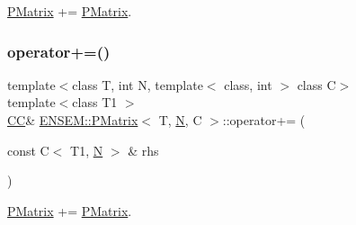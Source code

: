 \mbox{\hyperlink{classENSEM_1_1PMatrix}{P\+Matrix}} += \mbox{\hyperlink{classENSEM_1_1PMatrix}{P\+Matrix}}. 

\mbox{\label{classENSEM_1_1PMatrix_af6bd651888f2621169845b757b2200ee}} 
\subsubsection{\texorpdfstring{operator+=()}{operator+=()}\hspace{0.1cm}{\footnotesize\ttfamily [3/6]}}
{\footnotesize\ttfamily template$<$class T, int N, template$<$ class, int $>$ class C$>$ \\
template$<$class T1 $>$ \\
\mbox{\hyperlink{classENSEM_1_1PMatrix_a744bac549029029effe32dc1705660ec}{CC}}\& \mbox{\hyperlink{classENSEM_1_1PMatrix}{E\+N\+S\+E\+M\+::\+P\+Matrix}}$<$ T, \mbox{\hyperlink{adat__devel_2lib_2hadron_2operator__name__util_8cc_a7722c8ecbb62d99aee7ce68b1752f337}{N}}, C $>$\+::operator+= (\begin{DoxyParamCaption}\item[{const C$<$ T1, \mbox{\hyperlink{adat__devel_2lib_2hadron_2operator__name__util_8cc_a7722c8ecbb62d99aee7ce68b1752f337}{N}} $>$ \&}]{rhs }\end{DoxyParamCaption})\hspace{0.3cm}{\ttfamily [inline]}}



\mbox{\hyperlink{classENSEM_1_1PMatrix}{P\+Matrix}} += \mbox{\hyperlink{classENSEM_1_1PMatrix}{P\+Matrix}}. 

\mbox{\label{classENSEM_1_1PMatrix_a141db586d4797230e05d41ab13c12a1e}} 
